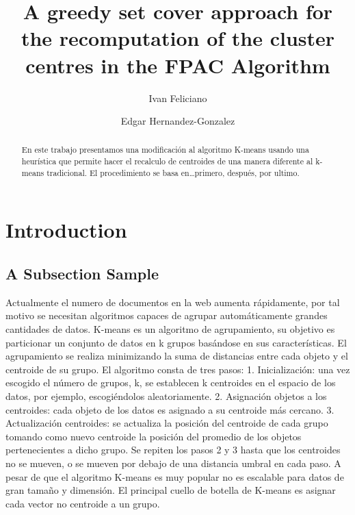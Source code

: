 \documentclass[runningheads]{llncs}
\begin{document}
%
\title{A greedy set cover approach for the recomputation of the cluster centres in the FPAC Algorithm}


\author{Ivan Feliciano \and
Edgar Hernandez-Gonzalez}
%
%
\maketitle              %
\begin{abstract}
En este trabajo presentamos una modificación al algoritmo K-means usando una heurística que permite hacer el recalculo de centroides de una manera diferente al k-means tradicional. El procedimiento se basa en…primero, después, por ultimo.

\end{abstract}
%
%
%
\section{Introduction}
\subsection{A Subsection Sample}
Actualmente el numero de documentos en la web aumenta rápidamente, por tal motivo se necesitan algoritmos capaces de agrupar automáticamente grandes cantidades de datos.
K-means es un algoritmo de agrupamiento, su objetivo es particionar un conjunto de datos en k grupos basándose en sus características. El agrupamiento se realiza minimizando la suma de distancias entre cada objeto y el centroide de su grupo.
El algoritmo consta de tres pasos:
1.	Inicialización: una vez escogido el número de grupos, k, se establecen k centroides en el espacio de los datos, por ejemplo, escogiéndolos aleatoriamente.
2.	Asignación objetos a los centroides: cada objeto de los datos es asignado a su centroide más cercano.
3.	Actualización centroides: se actualiza la posición del centroide de cada grupo tomando como nuevo centroide la posición del promedio de los objetos pertenecientes a dicho grupo.
Se repiten los pasos 2 y 3 hasta que los centroides no se mueven, o se mueven por debajo de una distancia umbral en cada paso.
A pesar de que el algoritmo K-means es muy popular no es escalable para datos de gran tamaño y dimensión.
El principal cuello de botella de K-means es asignar cada vector no centroide a un grupo.
\end{document}
